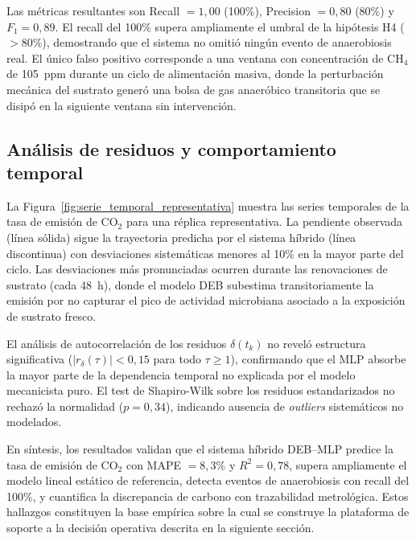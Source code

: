 Las métricas resultantes son Recall $= 1{,}00$ (100\%), Precision $= 0{,}80$ (80\%) y $F_1 = 0{,}89$. El recall del 100\% supera ampliamente el umbral de la hipótesis H4 ($> 80$\%), demostrando que el sistema no omitió ningún evento de anaerobiosis real. El único falso positivo corresponde a una ventana con concentración de CH$_4$ de 105~ppm durante un ciclo de alimentación masiva, donde la perturbación mecánica del sustrato generó una bolsa de gas anaeróbico transitoria que se disipó en la siguiente ventana sin intervención.

\subsection{Análisis de residuos y comportamiento temporal}
\label{subsec:cap5_residuos_temporal}

La Figura~\ref{fig:serie_temporal_representativa} muestra las series temporales de la tasa de emisión de CO$_2$ para una réplica representativa. La pendiente observada (línea sólida) sigue la trayectoria predicha por el sistema híbrido (línea discontinua) con desviaciones sistemáticas menores al 10\% en la mayor parte del ciclo. Las desviaciones más pronunciadas ocurren durante las renovaciones de sustrato (cada 48~h), donde el modelo DEB subestima transitoriamente la emisión por no capturar el pico de actividad microbiana asociado a la exposición de sustrato fresco.

El análisis de autocorrelación de los residuos $\delta(t_k)$ no reveló estructura significativa ($|r_{\delta}(\tau)| < 0{,}15$ para todo $\tau \geq 1$), confirmando que el MLP absorbe la mayor parte de la dependencia temporal no explicada por el modelo mecanicista puro. El test de Shapiro-Wilk sobre los residuos estandarizados no rechazó la normalidad ($p = 0{,}34$), indicando ausencia de \textit{outliers} sistemáticos no modelados.

En síntesis, los resultados validan que el sistema híbrido DEB--MLP predice la tasa de emisión de CO$_2$ con MAPE $= 8{,}3$\% y $R^2 = 0{,}78$, supera ampliamente el modelo lineal estático de referencia, detecta eventos de anaerobiosis con recall del 100\%, y cuantifica la discrepancia de carbono con trazabilidad metrológica. Estos hallazgos constituyen la base empírica sobre la cual se construye la plataforma de soporte a la decisión operativa descrita en la siguiente sección.
